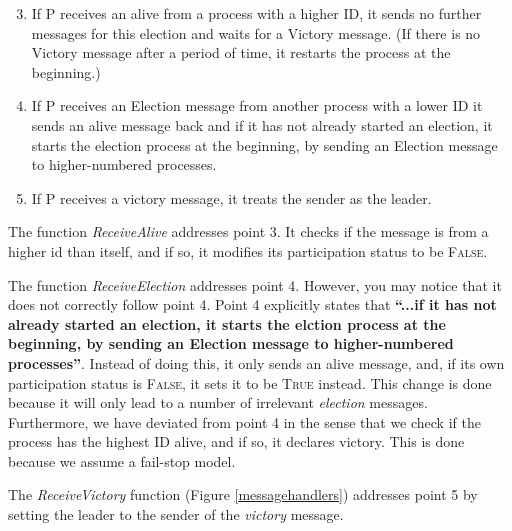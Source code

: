 \documentclass{report}
\begin{document}
\begin{enumerate}
  \setcounter{enumi}{2}
  \item If P receives an alive from a process with a higher ID, it sends no further messages for this election and waits for a Victory message. (If there is no Victory message after a period of time, it restarts the process at the beginning.)
  \item If P receives an Election message from another process with a lower ID it sends an alive message back and if it has not already started an election, it starts the election process at the beginning, by sending an Election message to higher-numbered processes.
  \item If P receives a victory message, it treats the sender as the leader.
\end{enumerate}

The function \textit{ReceiveAlive} addresses point 3. It checks if the message is from a higher id than itself, and if so, it modifies its participation status to be \textsc{False}.

The function \textit{ReceiveElection} addresses point 4. However, you may notice that it does not correctly follow point 4. Point 4 explicitly states that \textbf{``...if it has not already started an election, it starts the elction process at the beginning, by sending an Election message to higher-numbered processes''}. Instead of doing this, it only sends an alive message, and, if its own participation status is \textsc{False}, it sets it to be \textsc{True} instead. This change is done because it will only lead to a number of irrelevant \textit{election} messages. Furthermore, we have deviated from point 4 in the sense that we check if the process has the highest ID alive, and if so, it declares victory. This is done because we assume a fail-stop model.

The \textit{ReceiveVictory} function (Figure \ref{messagehandlers}) addresses point 5 by setting the leader to the sender of the \textit{victory} message.
\end{document}
